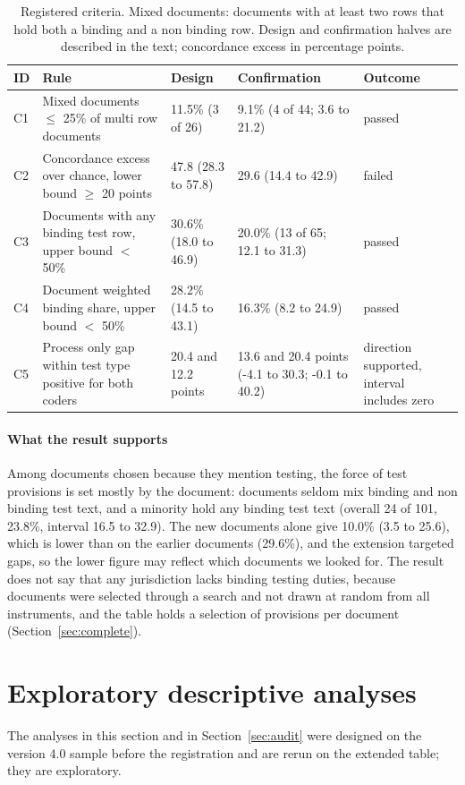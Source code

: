 \documentclass[conference]{IEEEtran}
\begin{document}
\begin{table}[t]\centering\small
\begin{tabular}{@{}p{0.5cm}p{2.2cm}p{1.5cm}p{2.3cm}p{1.2cm}@{}}\toprule
ID & Rule & Design & Confirmation & Outcome \\ \midrule
C1 & Mixed documents $\le$ 25\% of multi row documents & 11.5\% (3 of 26) & 9.1\% (4 of 44; 3.6 to 21.2) & passed \\
C2 & Concordance excess over chance, lower bound $\ge$ 20 points & 47.8 (28.3 to 57.8) & 29.6 (14.4 to 42.9) & failed \\
C3 & Documents with any binding test row, upper bound $<$ 50\% & 30.6\% (18.0 to 46.9) & 20.0\% (13 of 65; 12.1 to 31.3) & passed \\
C4 & Document weighted binding share, upper bound $<$ 50\% & 28.2\% (14.5 to 43.1) & 16.3\% (8.2 to 24.9) & passed \\
C5 & Process only gap within test type positive for both coders & 20.4 and 12.2 points & 13.6 and 20.4 points (-4.1 to 30.3; -0.1 to 40.2) & direction supported, interval includes zero \\
\bottomrule\end{tabular}
\caption{Registered criteria. Mixed documents: documents with at least two rows that hold both a binding and a non binding row. Design and confirmation halves are described in the text; concordance excess in percentage points.}\label{tab:p6conf}
\end{table}
\paragraph{What the result supports} Among documents chosen because they mention testing, the force of test provisions is set mostly by the document: documents seldom mix binding and non binding test text, and a minority hold any binding test text (overall 24 of 101, 23.8\%, interval 16.5 to 32.9). The new documents alone give 10.0\% (3.5 to 25.6), which is lower than on the earlier documents (29.6\%), and the extension targeted gaps, so the lower figure may reflect which documents we looked for. The result does not say that any jurisdiction lacks binding testing duties, because documents were selected through a search and not drawn at random from all instruments, and the table holds a selection of provisions per document (Section~\ref{sec:complete}).

\section{Exploratory descriptive analyses}\label{sec:findings}
The analyses in this section and in Section~\ref{sec:audit} were designed on the version 4.0 sample before the registration and are rerun on the extended table; they are exploratory.
\end{document}
